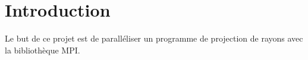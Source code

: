 \section{Introduction} %
\label{sec:introduction}
Le but de ce projet est de paralléliser un programme de projection de rayons avec la bibliothèque MPI.  

